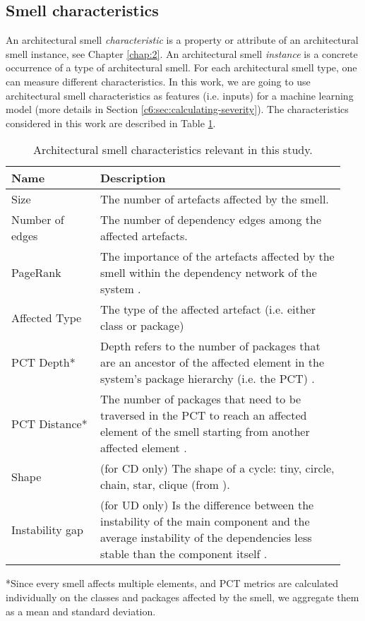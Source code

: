 \subsection{Smell characteristics}
An architectural smell \emph{characteristic} is a property or attribute of an architectural smell instance, see Chapter \ref{chap:2}. 
An architectural smell \emph{instance} is a concrete occurrence of a type of architectural smell.
For each architectural smell type, one can measure different characteristics.
In this work, we are going to use architectural smell characteristics as features (i.e. inputs) for a machine learning model (more details in Section \ref{c6:sec:calculating-severity}).
The characteristics considered in this work are described in Table \ref{c6:tab:characteristics}.

\begin{table}[tbp]
   \footnotesize
    \centering
    \caption{Architectural smell characteristics relevant in this study.}\label{c6:tab:characteristics}
    \begin{tabular}{p{0.25\linewidth}|p{0.69\linewidth}}\toprule
        \textbf{Name} & \textbf{Description} \\ \midrule
        Size & The number of artefacts affected by the smell. \\
        Number of edges & The number of dependency edges among the affected artefacts. \\ 
        PageRank & The importance of the artefacts affected by the smell within the dependency network of the system \cite{Roveda2018}. \\
        Affected Type & The type of the affected artefact (i.e. either class or package) \\
        PCT Depth* & Depth refers to the number of packages that are an ancestor of the affected element in the system's package hierarchy (i.e. the PCT) \cite{Laval2012}. \\
        PCT Distance* & The number of packages that need to be traversed in the PCT to reach an affected element of the smell starting from another affected element \cite{Laval2012,AlMutawa2014}.\\
        Shape & (for CD only) The shape of a cycle: tiny, circle, chain, star, clique (from \cite{AlMutawa2014}). \\
        Instability gap & (for UD only) Is the difference between the instability of the main component and the average instability of the dependencies less stable than the component itself \cite{Arcelli2016}. \\\midrule
    \end{tabular}
    \scriptsize{*Since every smell affects multiple elements, and PCT metrics are calculated individually on the classes and packages affected by the smell, we aggregate them as a mean and standard deviation.}
\end{table}

